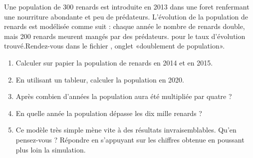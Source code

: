 
\begin{exercice}\label{exosmath-0314}

    Une population de \( 300\) renards est introduite en 2013 dans une foret renfermant une nourriture abondante et peu de prédateurs. L'évolution de la population de renards est modélisée comme suit : chaque année le nombre de renards double, mais 200 renards meurent mangés par des prédateurs.  pour le taux d'évolution trouvé.Rendez-vous dans le fichier , onglet «doublement de population». 

    \begin{enumerate}
        \item
            Calculer sur papier la population de renards en 2014 et en 2015.
        \item
            En utilisant un tableur, calculer la population en 2020.
        \item
            Après combien d'années la population aura été multipliée par quatre ?
        \item
            En quelle année la population dépasse les dix mille renards ?
        \item
            Ce modèle très simple mène vite à des résultats invraisemblables. Qu'en pensez-vous ? Répondre en s'appuyant sur les chiffres obtenue en poussant plus loin la simulation.
    \end{enumerate}

\end{exercice}
